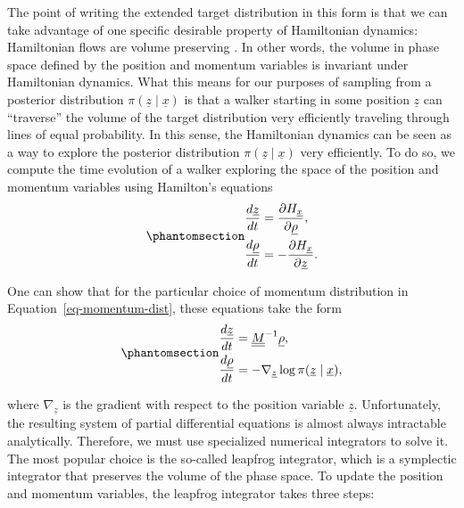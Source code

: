 \documentclass[
]{scrartcl}
\begin{document}
\begin{refsection}
The point of writing the extended target distribution in this form is
that we can take advantage of one specific desirable property of
Hamiltonian dynamics: Hamiltonian flows are volume preserving
\autocite{betancourt2017}. In other words, the volume in phase space
defined by the position and momentum variables is invariant under
Hamiltonian dynamics. What this means for our purposes of sampling from
a posterior distribution \(\pi(\underline{z} \mid \underline{x})\) is
that a walker starting in some position \(\underline{z}\) can
``traverse'' the volume of the target distribution very efficiently
traveling through lines of equal probability. In this sense, the
Hamiltonian dynamics can be seen as a way to explore the posterior
distribution \(π(\underline{z} \mid \underline{x})\) very efficiently.
To do so, we compute the time evolution of a walker exploring the space
of the position and momentum variables using Hamilton's equations
\begin{equation}\phantomsection\label{eq-hamilton-eqs}{
\begin{aligned} \frac{d\underline{z}}{dt} &= \frac{\partial
H_{\underline{x}}}{\partial \underline{\rho}}, \\ \frac{d\underline{\rho}}{dt} &=
-\frac{\partial H_{\underline{x}}}{\partial \underline{z}}. \end{aligned}
}\end{equation}

One can show that for the particular choice of momentum distribution in
Equation~\ref{eq-momentum-dist}, these equations take the form
\begin{equation}\phantomsection\label{eq-hamilton-eqs-expanded}{
\begin{aligned}
\frac{d\underline{z}}{dt} &= \underline{\underline{M}}^{-1} \underline{\rho}, \\
\frac{d\underline{\rho}}{dt} &= 
-\nabla_{\underline{z}} \log \pi(\underline{z} \mid \underline{x}),
\end{aligned}
}\end{equation}

where \(\nabla_{\underline{z}}\) is the gradient with respect to the
position variable \(\underline{z}\). Unfortunately, the resulting system
of partial differential equations is almost always intractable
analytically. Therefore, we must use specialized numerical integrators
to solve it. The most popular choice is the so-called leapfrog
integrator, which is a symplectic integrator that preserves the volume
of the phase space. To update the position and momentum variables, the
leapfrog integrator takes three steps:


\end{refsection}
\end{document}

